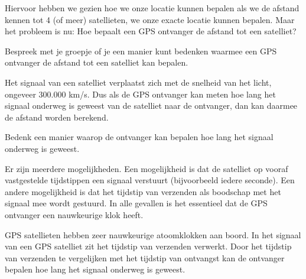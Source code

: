 Hiervoor hebben we gezien hoe we onze locatie kunnen bepalen als we de afstand kennen tot 4 (of meer) satellieten, we onze exacte locatie kunnen bepalen. Maar het probleem is nu: Hoe bepaalt een GPS ontvanger de afstand tot een satelliet?

\begin{opgave}[\discussie]
	Bespreek met je groepje of je een manier kunt bedenken waarmee een GPS ontvanger de afstand tot een satelliet kan bepalen.
\end{opgave}

Het signaal van een satelliet verplaatst zich met de snelheid van het licht, ongeveer 300.000 km/s. Dus als de GPS ontvanger kan meten hoe lang het signaal onderweg is geweest van de satelliet naar de ontvanger, dan kan daarmee de afstand worden berekend.

\begin{opgave}
	Bedenk een manier waarop de ontvanger kan bepalen hoe lang het signaal onderweg is geweest.
	\begin{antwoord}
		Er zijn meerdere mogelijkheden. Een mogelijkheid is dat de satelliet op vooraf vastgestelde tijdstippen een signaal verstuurt (bijvoorbeeld iedere seconde). Een andere mogelijkheid is dat het tijdstip van verzenden als boodschap met het signaal mee wordt gestuurd. In alle gevallen is het essentieel dat de GPS ontvanger een nauwkeurige klok heeft.
	\end{antwoord}
\end{opgave}

GPS satellieten hebben zeer nauwkeurige atoomklokken aan boord. In het signaal van een GPS satelliet zit het tijdstip van verzenden verwerkt. Door het tijdstip van verzenden te vergelijken met het tijdstip van ontvangst kan de ontvanger bepalen hoe lang het signaal onderweg is geweest.

